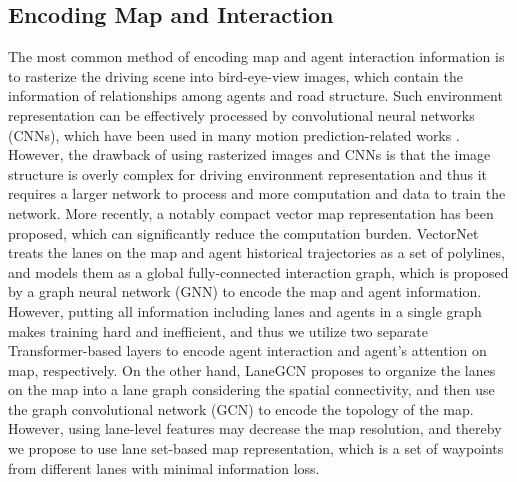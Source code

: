 \documentclass[letterpaper, 10 pt, conference]{ieeeconf}
\begin{document}
\subsection{Encoding Map and Interaction}
The most common method of encoding map and agent interaction information is to rasterize the driving scene into bird-eye-view images, which contain the information of relationships among agents and road structure. Such environment representation can be effectively processed by convolutional neural networks (CNNs), which have been used in many motion prediction-related works \cite{cui2019multimodal, salzmann2020trajectron++, dong2021multi}. However, the drawback of using rasterized images and CNNs is that the image structure is overly complex for driving environment representation and thus it requires a larger network to process and more computation and data to train the network. More recently, a notably compact vector map representation \cite{gao2020vectornet, liang2020learning} has been proposed, which can significantly reduce the computation burden. VectorNet \cite{gao2020vectornet} treats the lanes on the map and agent historical trajectories as a set of polylines, and models them as a global fully-connected interaction graph, which is proposed by a graph neural network (GNN) to encode the map and agent information. However, putting all information including lanes and agents in a single graph makes training hard and inefficient, and thus we utilize two separate Transformer-based layers to encode agent interaction and agent's attention on map, respectively. On the other hand, LaneGCN \cite{liang2020learning} proposes to organize the lanes on the map into a lane graph considering the spatial connectivity, and then use the graph convolutional network (GCN) to encode the topology of the map. However, using lane-level features may decrease the map resolution, and thereby we propose to use lane set-based map representation, which is a set of waypoints from different lanes with minimal information loss.
\end{document}
